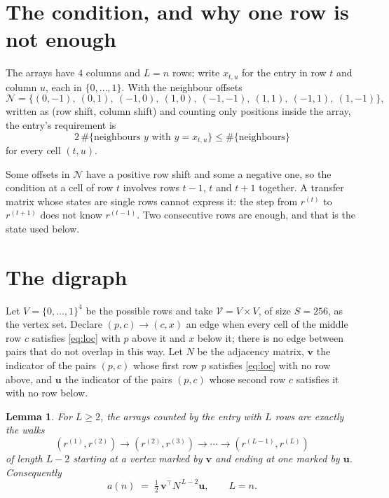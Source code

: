 \documentclass[11pt,a4paper]{article}
\theoremstyle{plain}
\newtheorem{lemma}[theorem]{Lemma}
\theoremstyle{definition}
\begin{document}
\section{The condition, and why one row is not enough}

The arrays have $4$ columns and $L=n$ rows; write $x_{t,u}$ for the entry in
row $t$ and column $u$, each in $\{0,\dots,1\}$. With the neighbour offsets
\[
\mathcal N=\{(0,-1),\ (0,1),\ (-1,0),\ (1,0),\ (-1,-1),\ (1,1),\ (-1,1),\ (1,-1)\},
\]
written as (row shift, column shift) and counting only positions inside the array, the
entry's requirement is
\begin{equation}\label{eq:loc}
2\,\#\{\text{neighbours }y\text{ with }y=x_{t,u}\}\le\#\{\text{neighbours}\}
\end{equation}
for every cell $(t,u)$.

Some offsets in $\mathcal N$ have a positive row shift and some a negative one, so the
condition at a cell of row $t$ involves rows $t-1$, $t$ and $t+1$ together. A transfer
matrix whose states are single rows cannot express it: the step from $r^{(t)}$ to
$r^{(t+1)}$ does not know $r^{(t-1)}$. Two consecutive rows are enough, and that is
the state used below.

\section{The digraph}

Let $V=\{0,\dots,1\}^{4}$ be the possible rows and take
$\mathcal V=V\times V$, of size $S=256$, as the vertex set. Declare $(p,c)\to(c,x)$ an edge
when every cell of the middle row $c$ satisfies \eqref{eq:loc} with $p$ above it and $x$
below it; there is no edge between pairs that do not overlap in this way. Let $N$ be the
adjacency matrix, $\mathbf{v}$ the indicator of the pairs $(p,c)$ whose first row $p$
satisfies \eqref{eq:loc} with no row above, and $\mathbf{u}$ the indicator of
the pairs $(p,c)$ whose second row $c$ satisfies it with no row below.

\begin{lemma}\label{lem:walk}
For $L\ge2$, the arrays counted by the entry with $L$ rows are exactly the walks
\[
(r^{(1)},r^{(2)})\to(r^{(2)},r^{(3)})\to\cdots\to(r^{(L-1)},r^{(L)})
\]
of length $L-2$ starting at a vertex marked by $\mathbf{v}$ and ending at one marked by
$\mathbf{u}$. Consequently
\[
a(n)\;=\;\tfrac1{2}\,\mathbf{v}^{\!\top}N^{\,L-2}\mathbf{u},\qquad L=n .
\]
\end{lemma}
\end{document}
